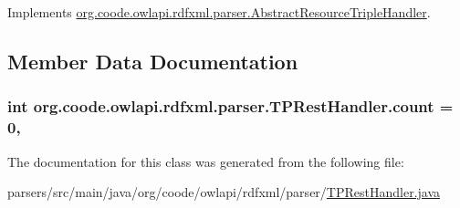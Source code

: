 Implements \hyperlink{classorg_1_1coode_1_1owlapi_1_1rdfxml_1_1parser_1_1_abstract_resource_triple_handler_acfa19ca318d5aaf7fc66e361ba02e7e8}{org.\-coode.\-owlapi.\-rdfxml.\-parser.\-Abstract\-Resource\-Triple\-Handler}.



\subsection{Member Data Documentation}
\hypertarget{classorg_1_1coode_1_1owlapi_1_1rdfxml_1_1parser_1_1_t_p_rest_handler_a94411c9cd1de5a67bbcd153df4b30ab6}{
\subsubsection[{count}]{\setlength{\rightskip}{0pt plus 5cm}int org.\-coode.\-owlapi.\-rdfxml.\-parser.\-T\-P\-Rest\-Handler.\-count = 0\hspace{0.3cm}{\ttfamily [static]}, {\ttfamily [protected]}}}\label{classorg_1_1coode_1_1owlapi_1_1rdfxml_1_1parser_1_1_t_p_rest_handler_a94411c9cd1de5a67bbcd153df4b30ab6}


The documentation for this class was generated from the following file\-:\begin{DoxyCompactItemize}
\item 
parsers/src/main/java/org/coode/owlapi/rdfxml/parser/\hyperlink{_t_p_rest_handler_8java}{T\-P\-Rest\-Handler.\-java}\end{DoxyCompactItemize}
